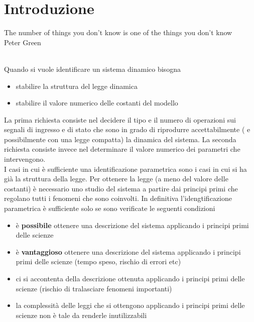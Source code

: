 \documentclass[10pt,a4paper,oneside,openany,noindent]{book}
\begin{document}
\chapter{Introduzione}
\begin{minipage}{0.5\textwidth}
\noindent
The number of things you don't know is one of the things you don't know\vspace{1em}\\Peter Green
\end{minipage}\vspace{3em}\\
Quando si vuole identificare un sistema dinamico bisogna
\begin{itemize}
\item stabilire la struttura del legge dinamica
\item stabilire il valore numerico delle costanti del modello
\end{itemize}
La prima richiesta consiste nel decidere il tipo e il numero di operazioni sui segnali di ingresso e di stato che sono in grado di riprodurre accettabilmente ( e possibilmente con una legge compatta) la dinamica del sistema.
La seconda richiesta consiste invece nel determinare il valore numerico dei parametri che intervengono.\\


I casi in cui è sufficiente una identificazione parametrica sono i casi in cui si ha già la struttura della legge. Per ottenere la legge (a meno del valore delle costanti) è necessario uno studio del sistema a partire dai principi primi che regolano tutti i fenomeni che sono coinvolti. In definitiva l'idengtificazione parametrica è sufficiente solo se sono verificate le seguenti condizioni
\begin{itemize}
\item è \textbf{possibile} ottenere una descrizione del sistema applicando i principi primi delle scienze
\item è \textbf{vantaggioso} ottenere una descrizione del sistema applicando i principi primi delle scienze (tempo speso, rischio di errori etc)
\item ci si accontenta della descrizione ottenuta applicando i principi primi delle scienze (rischio di tralasciare fenomeni importanti)
\item la complessità delle leggi che si ottengono applicando i principi primi delle scienze non è tale da renderle inutilizzabili
\end{itemize}
\end{document}
